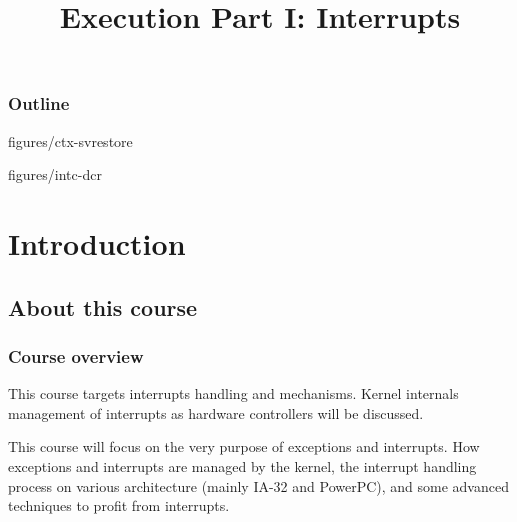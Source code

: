 %
%
%
%
%
%

%
%

%
%

\def\path{../../../..}

%
%



%
%

\title{Execution Part I: Interrupts}

%
%



%
%

\begin{frame}
  \titlepage
\end{frame}

%
%

\begin{frame}
  \frametitle{Outline}

  \tableofcontents
\end{frame}

%
%

                {figures/ctx-svrestore}

                {figures/intc-dcr}


%
%

%
%

\section{Introduction}

\subsection{About this course}


\begin{frame}
  \frametitle{Course overview}

  This course targets interrupts handling and mechanisms. Kernel internals management of interrupts as hardware controllers will be discussed.

  \-

This course will focus on the very purpose of exceptions and interrupts. How exceptions and interrupts are managed by the kernel, the interrupt handling process on various architecture (mainly IA-32 and PowerPC), and some advanced techniques to profit from interrupts.

\end{frame}


